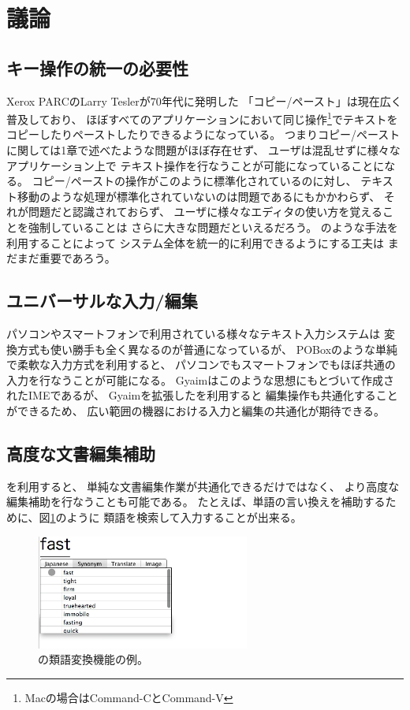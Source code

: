 \section{議論}

\subsection{キー操作の統一の必要性}

Xerox PARCのLarry Teslerが70年代に発明した\cite{Tesler:CopyPaste}
「コピー/ペースト」は現在広く普及しており、
ほぼすべてのアプリケーションにおいて同じ操作\footnote{
  Macの場合はCommand-CとCommand-V
}でテキストをコピーしたりペーストしたりできるようになっている。
つまりコピー/ペーストに関しては1章で述べたような問題がほぼ存在せず、
ユーザは混乱せずに様々なアプリケーション上で
テキスト操作を行なうことが可能になっていることになる。
コピー/ペーストの操作がこのように標準化されているのに対し、
テキスト移動のような処理が標準化されていないのは問題であるにもかかわらず、
それが問題だと認識されておらず、
ユーザに様々なエディタの使い方を覚えることを強制していることは
さらに大きな問題だといえるだろう。
{\system}のような手法を利用することによって
システム全体を統一的に利用できるようにする工夫は
まだまだ重要であろう。

\subsection{ユニバーサルな入力/編集}

パソコンやスマートフォンで利用されている様々なテキスト入力システムは
変換方式も使い勝手も全く異なるのが普通になっているが、
POBox\cite{Masui:POBox}のような単純で柔軟な入力方式を利用すると、
パソコンでもスマートフォンでもほぼ共通の入力を行なうことが可能になる。
Gyaimはこのような思想にもとづいて作成されたIMEであるが、
Gyaimを拡張した{\system}を利用すると
編集操作も共通化することができるため、
広い範囲の機器における入力と編集の共通化が期待できる。

\subsection{高度な文書編集補助}

{\system}を利用すると、
単純な文書編集作業が共通化できるだけではなく、
より高度な編集補助を行なうことも可能である。
たとえば、単語の言い換えを補助するために、図\ref{synonym}のように
類語を検索して入力することが出来る。

\begin{figure}[H]
\centerline{\includegraphics[width=70mm,bb=0 0 350 250]{figures/synonym.png}}
\caption{{\system}の類語変換機能の例。}
\label{synonym}
\end{figure}

